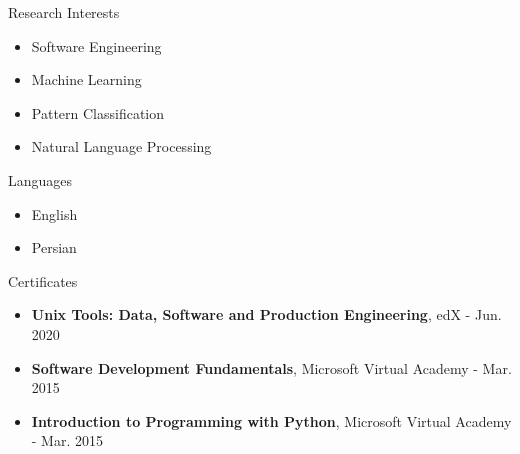 \documentclass{resume} %
\begin{document}
\begin{paracol}{2}
\begin{rSection}{Research Interests}
	
	\begin{itemize}
		\item Software Engineering
		\item Machine Learning
		\item Pattern Classification
		\item Natural Language Processing
	\end{itemize}
	
\end{rSection}
\switchcolumn
\begin{rSection}{Languages}
	
	\begin{itemize}
		\item English
		\item Persian 
	\end{itemize}
	
\end{rSection}
\end{paracol}

\begin{rSection}{Certificates}
	
	\begin{itemize}
		\item \textbf{Unix Tools: Data, Software and Production Engineering}, edX - Jun. 2020
		\item \textbf{Software Development Fundamentals}, Microsoft Virtual Academy - Mar. 2015
		\item \textbf{Introduction to Programming with Python}, Microsoft Virtual Academy - Mar. 2015
	\end{itemize}
	
\end{rSection}





\end{document}
